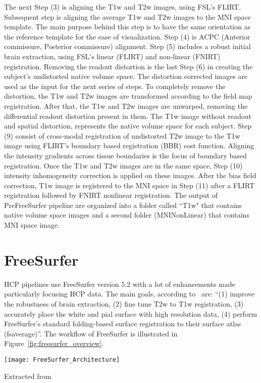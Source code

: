 The next Step (3) is aligning the T1w and T2w images, using FSL's FLIRT. Subsequent step is aligning the average T1w and T2w images to the MNI space template. The main purpose behind this step is to have the same orientation as the reference template for the ease of visualization. Step (4) is ACPC (Anterior commissure, Posterior commissure) alignment. Step (5) includes a robust initial brain extraction, using FSL's linear (FLIRT) and non-linear (FNIRT) registration. Removing the readout distortion is the last Step (6) in creating the subject's undistorted native volume space. The distortion corrected images are used as the input for the next series of steps. To completely remove the distortion, the T1w and T2w images are transformed according to the field map registration. After that, the T1w and T2w images are unwarped, removing the differential readout distortion present in them. The T1w image without readout and spatial distortion, represents the native volume space for each subject. Step (9) consist of cross-modal registration of undistorted T2w image to the T1w image using FLIRT's boundary based registration (BBR) cost function. Aligning the intensity gradients across tissue boundaries is the focus of boundary based registration. Once the T1w and T2w images are in the same space, Step (10) intensity inhomogeneity correction is applied on these images. After the bias field correction, T1w image is registered to the MNI space in Step (11) after a FLIRT registration followed by FNIRT nonlinear registration. The output of PreFreeSurfer pipeline are organized into a folder called ``T1w" that contains native volume space images and a second folder (MNINonLinear) that contains MNI space image.~\cite{Gla13}

\section{FreeSurfer} \label{sec:FreeSurfer}
HCP pipelines use FreeSurfer version 5.2 with a lot of enhancements made particularly focusing HCP data. The main goals, according to~\cite{Gla13} are: ``(1) improve the robustness of brain extraction, (2) fine tune T2w to T1w registration, (3) accurately place the white and pial surface with high resolution data, (4) perform FreeSurfer's standard folding-based surface registration to their surface atlas (fsaverage)''. The workflow of FreeSurfer is illustrated in Figure~\ref{fig:freesurfer_overview}.

\begin{center}
  \texttt{[image: FreeSurfer\_Architecture]}
  \label{fig:freesurfer_overview}
  \caption*{Extracted from \cite{Gla13}}
\end{center}

